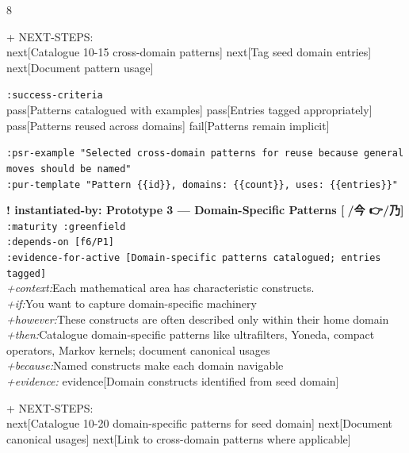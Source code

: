 \documentclass[landscape]{article}
\newcommand{\flexitag}[1]{\textcolor[gray]{0.35}{\textit{#1}}}
\newenvironment{devmapgreenfield}{%
  \def\FrameCommand{\colorbox{devmapgreenfieldbg}}%
  \setlength{\fboxsep}{2pt}%
  \MakeFramed{\advance\hsize-\width \FrameRestore}%
}{\endMakeFramed}
\begin{document}
\begin{paracol}{8}
\begin{devmapgreenfield}
  + NEXT-STEPS:\\
    next[Catalogue 10-15 cross-domain patterns] next[Tag seed domain entries] next[Document pattern usage]\\
\par
  \texttt{:\allowbreak{}success-\allowbreak{}criteria}\\
    pass[Patterns catalogued with examples] pass[Entries tagged appropriately] pass[Patterns reused across domains] fail[Patterns remain implicit]\\
\par
  \texttt{:\allowbreak{}psr-\allowbreak{}example "Selected cross-\allowbreak{}domain patterns for reuse because general moves should be named"}\\
  \texttt{:\allowbreak{}pur-\allowbreak{}template "Pattern \{\{id\}\},\allowbreak{} domains:\allowbreak{} \{\{count\}\},\allowbreak{} uses:\allowbreak{} \{\{entries\}\}"}\\
\par
\par
\end{devmapgreenfield}
\begin{devmapgreenfield}
\textbf{! instantiated-by: Prototype 3 — Domain-Specific Patterns [🔺/今 👉/乃]}\\
  \texttt{:\allowbreak{}maturity :\allowbreak{}greenfield}\\
  \texttt{:\allowbreak{}depends-\allowbreak{}on [f6/\allowbreak{}P1]}\\
  \texttt{:\allowbreak{}evidence-\allowbreak{}for-\allowbreak{}active [Domain-\allowbreak{}specific patterns catalogued;\allowbreak{} entries tagged]}\\
  \flexitag{+context:}Each mathematical area has characteristic constructs.\\
  \flexitag{+if:}You want to capture domain-specific machinery\\
  \flexitag{+however:}These constructs are often described only within their home domain\\
  \flexitag{+then:}Catalogue domain-specific patterns like ultrafilters, Yoneda, compact operators, Markov kernels; document canonical usages\\
  \flexitag{+because:}Named constructs make each domain navigable\\
  \flexitag{+evidence:} evidence[Domain constructs identified from seed domain]\\
\par
  + NEXT-STEPS:\\
    next[Catalogue 10-20 domain-specific patterns for seed domain] next[Document canonical usages] next[Link to cross-domain patterns where applicable]\\

\end{devmapgreenfield}
\end{paracol}
\end{document}
